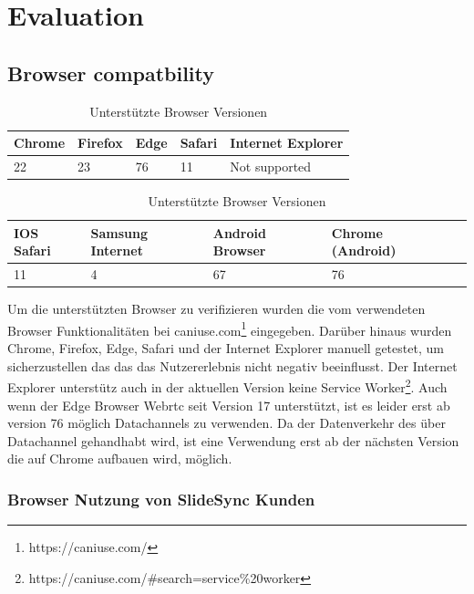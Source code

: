 \chapter{Evaluation}\label{ch:evaluation}

\section{Browser compatbility}
\begin{table}[!htb]
\begin{center}

	\begin{tabular}{|l|l|l|l|l|}
		\hline
		Chrome & Firefox & Edge & Safari & Internet Explorer	  \\ \hline
		22 	   & 23 	  & 76	 & 11	  & Not supported    				\\ \hline
	\end{tabular}
	
	\begin{tabular}{|l|l|l|l|l|}
		\hline
		IOS Safari & Samsung Internet & Android Browser	& Chrome (Android) \\ \hline
		11	   & 4				  & 67				& 76  \\ \hline
	\end{tabular}

	\caption{Unterstützte Browser Versionen}
\end{center}
\end{table}

Um die unterstützten Browser zu verifizieren wurden die vom \pTp \cdn verwendeten Browser Funktionalitäten bei caniuse.com\footnote{https://caniuse.com/} eingegeben. Darüber hinaus wurden Chrome, Firefox, Edge, Safari und der Internet Explorer manuell getestet, um sicherzustellen das das \pTp \cdn das Nutzererlebnis nicht negativ beeinflusst. Der Internet Explorer unterstütz auch in der aktuellen Version keine Service Worker\footnote{https://caniuse.com/#search=service\%20worker}. Auch wenn der Edge Browser Webrtc seit Version 17 unterstützt, ist es leider erst ab version 76 möglich Datachannels zu verwenden. Da der Datenverkehr des \pTp \cdns über Datachannel gehandhabt wird, ist eine Verwendung erst ab der nächsten Version die auf Chrome aufbauen wird, möglich.

\subsection{Browser Nutzung von SlideSync Kunden}


